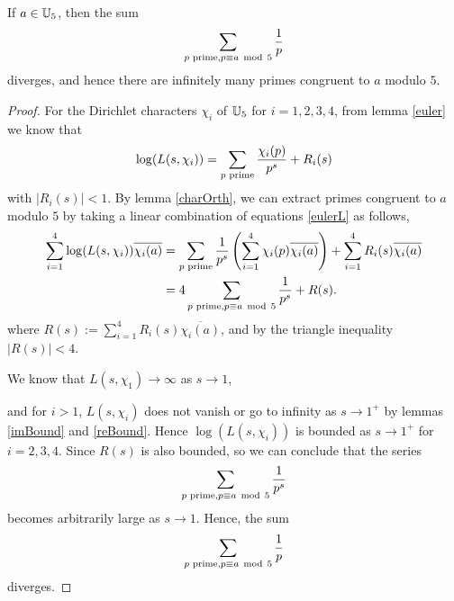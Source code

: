 \documentclass{unswmaths}
\begin{document}
    \begin{theorem}
        If $a \in \mathbb{U}_5$, then the sum
        \begin{equation*}
            \sum_{{p\text{ prime}}, p \equiv a \;\operatorname{mod}\;5} \frac{1}{p}
        \end{equation*}
        diverges, and hence there are infinitely many primes congruent to $a$ modulo $5$.
    \end{theorem}
    \begin{proof}
        For the Dirichlet characters $\chi_i$ of $\mathbb{U}_5$ for $i = 1,2,3,4$, from lemma \ref{euler} we know that
        \begin{equation*}
        \label{eulerL}
            \log(L(s,\chi_i)) = \sum_{{p\text{ prime}}} \frac{\chi_i(p)}{p^s}+R_i(s)
        \end{equation*}
        with $|R_i(s)| < 1$. By lemma \ref{charOrth}, we can extract primes congruent to $a$ modulo $5$
        by taking a linear combination of equations \ref{eulerL} as follows,
        \begin{align*}
            \sum_{i=1}^4 \log(L(s,\chi_i))\overline{\chi_i(a)} &= \sum_{{p\text{ prime}}} \frac{1}{p^s}\left(\sum_{i=1}^4 \chi_i(p)\overline{\chi_i(a)}\right) + \sum_{i=1}^4 R_i(s)\overline{\chi_i(a)}\\
            &= 4\sum_{{p\text{ prime}}, p\equiv a\;\operatorname{mod}\;5} \frac{1}{p^s} + R(s).
        \end{align*}
        where $R(s) := \sum_{i=1}^4 R_i(s)\overline{\chi_i(a)}$, and by the triangle inequality $|R(s)| < 4$.
        
        We know that $L(s,\chi_1) \rightarrow \infty$ as $s\rightarrow 1$,
        
        
        and for $i> 1$, $L(s,\chi_i)$ does not vanish or go to infinity as $s\rightarrow 1^+$ by lemmas
        \ref{imBound} and \ref{reBound}. Hence
        $\log(L(s,\chi_i))$ is bounded as $s\rightarrow 1^+$ for $i = 2,3,4$. Since $R(s)$ is also
        bounded, so we can
        conclude that the series
        \begin{equation*}
            \sum_{{p\text{ prime}}, p\equiv a\;\operatorname{mod}\;5} \frac{1}{p^s}
        \end{equation*}
        becomes arbitrarily large as $s\rightarrow 1$. Hence, 
        the sum
        \begin{equation*}
            \sum_{{p\text{ prime}}, p\equiv a\;\operatorname{mod}\;5} \frac{1}{p}
        \end{equation*}
        diverges.
    \end{proof} 
    
\end{document}
